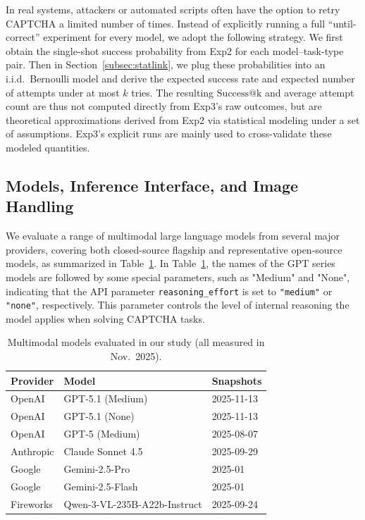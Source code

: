 \documentclass[sigconf, review]{acmart}
\begin{document}
In real systems, attackers or automated scripts often have the option to retry CAPTCHA a limited number of times. Instead of explicitly running a full “until-correct” experiment for every model, we adopt the following strategy. We first obtain the single-shot success probability from Exp2 for each model--task-type pair. Then in Section~\ref{subsec:statlink}, we plug these probabilities into an i.i.d.\ Bernoulli model and derive the expected success rate and expected number of attempts under at most $k$ tries. The resulting $\mathrm{Success@k}$ and average attempt count are thus not computed directly from Exp3’s raw outcomes, but are theoretical approximations derived from Exp2 via statistical modeling under a set of assumptions. Exp3’s explicit runs are mainly used to cross-validate these modeled quantities.


\subsection{Models, Inference Interface, and Image Handling}
\label{subsec:models}

We evaluate a range of multimodal large language models from several major providers, covering both closed-source flagship and representative open-source models, as summarized in Table~\ref{tab:eval-models}. In Table~\ref{tab:eval-models}, the names of the GPT series models are followed by some special parameters, such as "Medium" and "None", indicating that the API parameter \texttt{reasoning\_effort} is set to \texttt{"medium"} or \texttt{"none"}, respectively. This parameter controls the level of internal reasoning the model applies when solving CAPTCHA tasks.


\begin{table}[t]
\centering
\begin{tabular}{lll}
\toprule
\textbf{Provider} & \textbf{Model} & \textbf{Snapshots} \\
\midrule
OpenAI      & GPT-5.1 (Medium)             & 2025-11-13 \\
OpenAI      & GPT-5.1 (None)               & 2025-11-13 \\
OpenAI      & GPT-5 (Medium)               & 2025-08-07 \\
Anthropic   & Claude Sonnet 4.5            & 2025-09-29 \\
Google      & Gemini-2.5-Pro               & 2025-01 \\
Google      & Gemini-2.5-Flash             & 2025-01 \\
Fireworks   & Qwen-3-VL-235B-A22b-Instruct & 2025-09-24\\
\bottomrule
\end{tabular}
\caption{Multimodal models evaluated in our study (all measured in Nov.\ 2025).}
\label{tab:eval-models}
\end{table}
\end{document}
